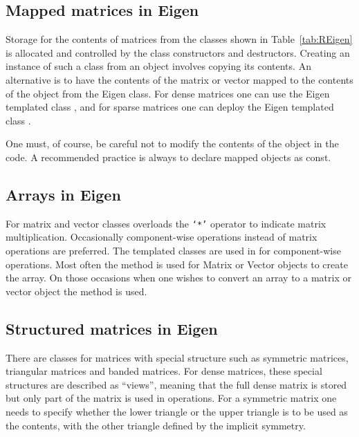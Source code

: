 \documentclass[shortnames,article]{jss}
\newcommand{\hlkwb}[1]{\textcolor[rgb]{0.13,0.54,0.13}{#1}}
\begin{document}
\subsection{Mapped matrices in Eigen}
\label{sec:mapped}

Storage for the contents of matrices from the classes shown in
Table~\ref{tab:REigen} is allocated and controlled by the class
constructors and destructors.  Creating an instance of such a class
from an  object involves copying its contents.  An
alternative is to have the contents of the  matrix or
vector mapped to the contents of the object from the Eigen class.  For
dense matrices one can use the Eigen templated class , and for
sparse matrices one can deploy the Eigen templated class .

One must, of course, be careful not to modify the contents of the
 object in the  code.  A recommended
practice is always to declare mapped objects as {\ttfamily\hlkwb{const}\normalfont}.

\subsection{Arrays in Eigen}
\label{sec:arrays}

For matrix and vector classes  overloads the \texttt{`*'}
operator to indicate matrix multiplication.  Occasionally
component-wise operations instead of matrix operations are preferred.  The
 templated classes are used in  for
component-wise operations.  Most often the  method is used
for Matrix or Vector objects to create the array.  On those occasions
when one wishes to convert an array to a matrix or vector object
the  method is used.

\subsection{Structured matrices in Eigen}
\label{sec:structured}

There are  classes for matrices with special structure such
as symmetric matrices, triangular matrices and banded matrices.  For
dense matrices, these special structures are described as ``views'',
meaning that the full dense matrix is stored but only part of the
matrix is used in operations.  For a symmetric matrix one needs to
specify whether the lower triangle or the upper triangle is to be used as
the contents, with the other triangle defined by the implicit symmetry.
\end{document}
